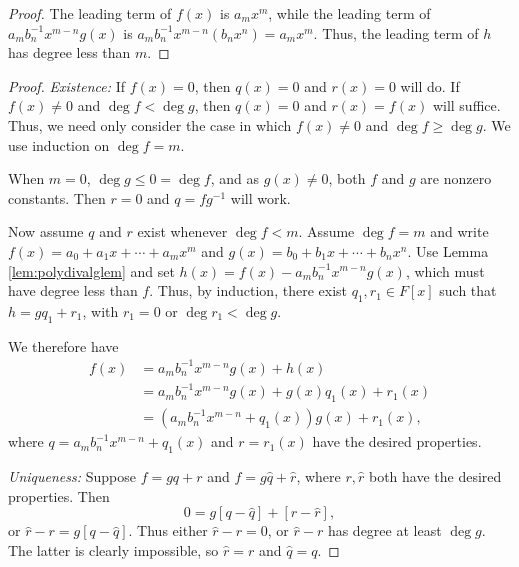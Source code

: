 \documentclass[english,course]{lecture}
\renewcommand{\le}{\leqslant}
\renewcommand{\ge}{\geqslant}
\newenvironment{hint}{\startimportant}{}
\def\startimportant#1\end{[{Hint:} #1]\end}
\theoremstyle{plain}
\def\presnotes{}
\begin{document}

\begin{proof}
	The leading term of $f(x)$ is $a_m x^m$, while the leading term of $a_m b_n^{-1} x^{m-n} g(x)$ is $a_m b_n^{-1} x^{m-n} (b_n x^n) = a_m x^m$. Thus, the leading term of $h$ has degree less than $m$.
\end{proof}

\presnotes



\begin{proof}
	\emph{Existence:} If $f(x) = 0$, then $q(x) = 0$ and $r(x) = 0$ will do. If $f(x)\ne 0$ and $\deg f < \deg g$, then $q(x) = 0$ and $r(x) = f(x)$ will suffice. Thus, we need only consider the case in which $f(x) \ne 0$ and $\deg f \ge \deg g$.	
	We use induction on $\deg f = m$.
	
	When $m = 0$, $\deg g \le 0 = \deg f$, and as $g(x) \ne 0$, both $f$ and $g$ are nonzero constants. Then $r = 0$ and $q = fg^{-1}$ will work.
	
	Now assume $q$ and $r$ exist whenever $\deg f < m$.
	Assume $\deg f = m$ and write $f(x) = a_0 + a_1 x + \cdots + a_m x^m$ and $g(x) = b_0 + b_1 x + \cdots + b_n x^n$.
	Use Lemma \ref{lem:polydivalglem} and set $h(x) = f(x) - a_m b_n^{-1} x^{m-n} g(x)$, which must have degree less than $f$.
	Thus, by induction, there exist $q_1, r_1\in F[x]$ such that $h = g q_1 + r_1$, with $r_1 = 0$ or $\deg r_1 < \deg g$.
	
	We therefore have
	\begin{align*}
		f(x) &= a_m b_n^{-1} x^{m-n} g(x) + h(x) \\
		&= a_m b_n^{-1} x^{m-n} g(x) + g(x) q_1(x) + r_1(x)\\
		&= (a_m b_n^{-1} x^{m-n} + q_1(x)) g(x) + r_1(x),
	\end{align*}
	where $q = a_m b_n^{-1} x^{m-n} + q_1(x)$ and $r = r_1(x)$ have the desired properties.
	
	\emph{Uniqueness:} Suppose $f = gq + r$ and $f = g\hat{q} + \hat{r}$, where $r,\hat{r}$ both have the desired properties.
	Then 
	\[
		0 = g[q - \hat{q}] + [r - \hat{r}],
	\]
	or $\hat{r} - r = g [q - \hat{q}]$.
	Thus either $\hat{r} - r = 0$, or $\hat{r} - r$ has degree at least $\deg g$.
	The latter is clearly impossible, so $\hat{r} = r$ and $\hat{q} = q$.
\end{proof}
\end{document}
